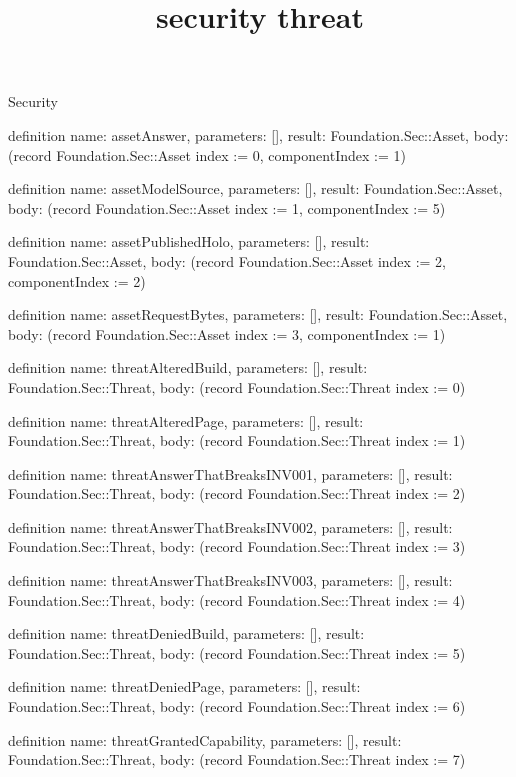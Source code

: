 \begin{lexlean}{Security}
\title{security threat}
\begin{semanticmodule}
definition{
  name: assetAnswer,
  parameters: [],
  result: Foundation.Sec::Asset,
  body: (record Foundation.Sec::Asset {index := 0, componentIndex := 1})
}

definition{
  name: assetModelSource,
  parameters: [],
  result: Foundation.Sec::Asset,
  body: (record Foundation.Sec::Asset {index := 1, componentIndex := 5})
}

definition{
  name: assetPublishedHolo,
  parameters: [],
  result: Foundation.Sec::Asset,
  body: (record Foundation.Sec::Asset {index := 2, componentIndex := 2})
}

definition{
  name: assetRequestBytes,
  parameters: [],
  result: Foundation.Sec::Asset,
  body: (record Foundation.Sec::Asset {index := 3, componentIndex := 1})
}

definition{
  name: threatAlteredBuild,
  parameters: [],
  result: Foundation.Sec::Threat,
  body: (record Foundation.Sec::Threat {index := 0})
}

definition{
  name: threatAlteredPage,
  parameters: [],
  result: Foundation.Sec::Threat,
  body: (record Foundation.Sec::Threat {index := 1})
}

definition{
  name: threatAnswerThatBreaksINV001,
  parameters: [],
  result: Foundation.Sec::Threat,
  body: (record Foundation.Sec::Threat {index := 2})
}

definition{
  name: threatAnswerThatBreaksINV002,
  parameters: [],
  result: Foundation.Sec::Threat,
  body: (record Foundation.Sec::Threat {index := 3})
}

definition{
  name: threatAnswerThatBreaksINV003,
  parameters: [],
  result: Foundation.Sec::Threat,
  body: (record Foundation.Sec::Threat {index := 4})
}

definition{
  name: threatDeniedBuild,
  parameters: [],
  result: Foundation.Sec::Threat,
  body: (record Foundation.Sec::Threat {index := 5})
}

definition{
  name: threatDeniedPage,
  parameters: [],
  result: Foundation.Sec::Threat,
  body: (record Foundation.Sec::Threat {index := 6})
}

definition{
  name: threatGrantedCapability,
  parameters: [],
  result: Foundation.Sec::Threat,
  body: (record Foundation.Sec::Threat {index := 7})
}


\end{semanticmodule}
\end{lexlean}

